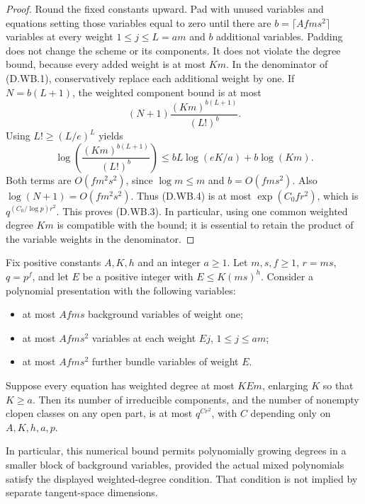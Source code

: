 \begin{proof}
Round the fixed constants upward. Pad with unused variables
and equations setting those variables equal to zero until
there are $b=\lceil Afms^2\rceil$ variables at every weight
$1\leq j\leq L=am$ and $b$ additional variables. Padding
does not change the scheme or its components. It does not
violate the degree bound, because every added weight is at
most $Km$. In the denominator of (D.WB.1), conservatively
replace each additional weight by one. If $N=b(L+1)$, the
weighted component bound is at most
\[
        (N+1)\frac{(Km)^{b(L+1)}}{(L!)^b}.              \tag{D.WB.4}
\]
Using $L!\geq(L/e)^L$ yields
\[
 \log\!\left(\frac{(Km)^{b(L+1)}}{(L!)^b}\right)
       \leq bL\log(eK/a)+b\log(Km).
                                                        \tag{D.WB.5}
\]
Both terms are $O(fm^2s^2)$, since $\log m\leq m$ and
$b=O(fms^2)$. Also $\log(N+1)=O(fm^2s^2)$.
Thus (D.WB.4) is at most $\exp(C_0fr^2)$, which is
$q^{(C_0/\log p)r^2}$. This proves (D.WB.3).
In particular, using one common weighted degree $Km$ is
compatible with the bound; it is essential to retain the
product of the variable weights in the denominator.
\end{proof}

\begin{corollary}
\label{D:weighted-normal-layer-background-budget}
Fix positive constants $A,K,h$ and an integer $a\geq1$.
Let $m,s,f\geq1$, $r=ms$, $q=p^f$, and let $E$ be a
positive integer with $E\leq K(ms)^h$.
Consider a polynomial presentation with the following variables:
\begin{itemize}
\item at most $Afms$ background variables of weight one;
\item at most $Afms^2$ variables at each weight
$Ej$, $1\leq j\leq am$;
\item at most $Afms^2$ further bundle variables of weight $E$.
\end{itemize}
Suppose every equation has weighted degree at most $KEm$,
enlarging $K$ so that $K\geq a$. Then its number of
irreducible components, and the number of nonempty clopen
classes on any open part, is at most $q^{Cr^2}$, with $C$
depending only on $A,K,h,a,p$.

In particular, this numerical bound permits polynomially
growing degrees in a smaller block of background variables,
provided the actual mixed polynomials satisfy the displayed
weighted-degree condition. That condition is not implied
by separate tangent-space dimensions.
\end{corollary}

